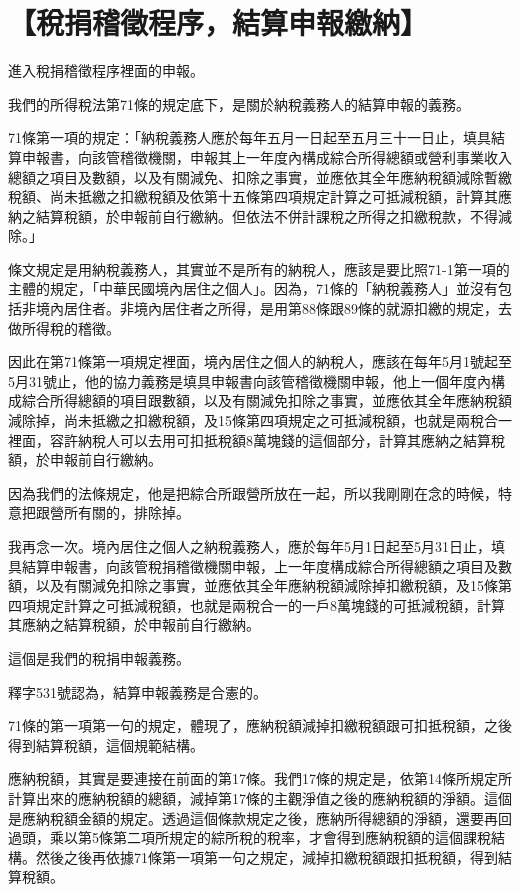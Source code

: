 \documentclass[]{ctexbook}
\begin{document}
\hypertarget{ux7a05ux6350ux7a3dux5fb5ux7a0bux5e8fux7d50ux7b97ux7533ux5831ux7e73ux7d0d}{%
\section{【稅捐稽徵程序，結算申報繳納】}\label{ux7a05ux6350ux7a3dux5fb5ux7a0bux5e8fux7d50ux7b97ux7533ux5831ux7e73ux7d0d}}

進入稅捐稽徵程序裡面的申報。

我們的所得稅法第71條的規定底下，是關於納稅義務人的結算申報的義務。

71條第一項的規定：「納稅義務人應於每年五月一日起至五月三十一日止，填具結算申報書，向該管稽徵機關，申報其上一年度內構成綜合所得總額或營利事業收入總額之項目及數額，以及有關減免、扣除之事實，並應依其全年應納稅額減除暫繳稅額、尚未抵繳之扣繳稅額及依第十五條第四項規定計算之可抵減稅額，計算其應納之結算稅額，於申報前自行繳納。但依法不併計課稅之所得之扣繳稅款，不得減除。」

條文規定是用納稅義務人，其實並不是所有的納稅人，應該是要比照71-1第一項的主體的規定，「中華民國境內居住之個人」。因為，71條的「納稅義務人」並沒有包括非境內居住者。非境內居住者之所得，是用第88條跟89條的就源扣繳的規定，去做所得稅的稽徵。

因此在第71條第一項規定裡面，境內居住之個人的納稅人，應該在每年5月1號起至5月31號止，他的協力義務是填具申報書向該管稽徵機關申報，他上一個年度內構成綜合所得總額的項目跟數額，以及有關減免扣除之事實，並應依其全年應納稅額減除掉，尚未抵繳之扣繳稅額，及15條第四項規定之可抵減稅額，也就是兩稅合一裡面，容許納稅人可以去用可扣抵稅額8萬塊錢的這個部分，計算其應納之結算稅額，於申報前自行繳納。

因為我們的法條規定，他是把綜合所跟營所放在一起，所以我剛剛在念的時候，特意把跟營所有關的，排除掉。

我再念一次。境內居住之個人之納稅義務人，應於每年5月1日起至5月31日止，填具結算申報書，向該管稅捐稽徵機關申報，上一年度構成綜合所得總額之項目及數額，以及有關減免扣除之事實，並應依其全年應納稅額減除掉扣繳稅額，及15條第四項規定計算之可抵減稅額，也就是兩稅合一的一戶8萬塊錢的可抵減稅額，計算其應納之結算稅額，於申報前自行繳納。

這個是我們的稅捐申報義務。

釋字531號認為，結算申報義務是合憲的。

71條的第一項第一句的規定，體現了，應納稅額減掉扣繳稅額跟可扣抵稅額，之後得到結算稅額，這個規範結構。

應納稅額，其實是要連接在前面的第17條。我們17條的規定是，依第14條所規定所計算出來的應納稅額的總額，減掉第17條的主觀淨值之後的應納稅額的淨額。這個是應納稅額金額的規定。透過這個條款規定之後，應納所得總額的淨額，還要再回過頭，乘以第5條第二項所規定的綜所稅的稅率，才會得到應納稅額的這個課稅結構。然後之後再依據71條第一項第一句之規定，減掉扣繳稅額跟扣抵稅額，得到結算稅額。
\end{document}

